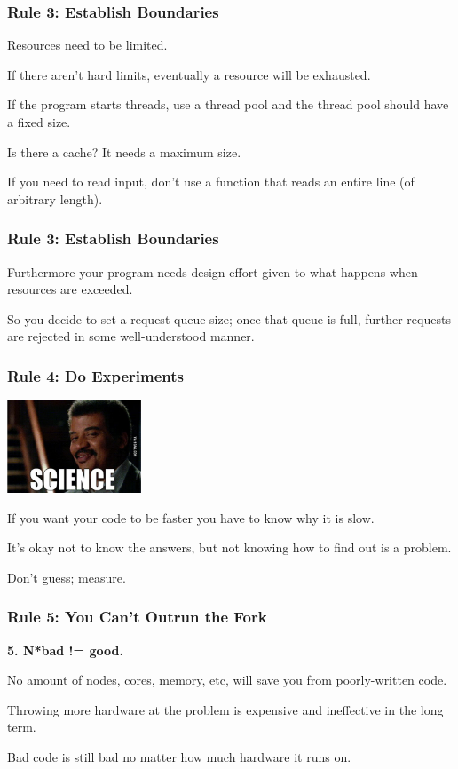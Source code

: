 \begin{frame}
\frametitle{Rule 3: Establish Boundaries}

Resources need to be limited. 

If there aren't hard limits, eventually a resource will be exhausted. 

If the program starts threads, use a thread pool and the thread pool should have a fixed size. 

Is there a cache? It needs a maximum size. 

If you need to read input, don't use a function that reads an entire line (of arbitrary length). 

\end{frame}



\begin{frame}
\frametitle{Rule 3: Establish Boundaries}

Furthermore your program needs design effort given to what happens when resources are exceeded. 

So you decide to set a request queue size; once that queue is full, further requests are rejected in some well-understood manner. 


\end{frame}



\begin{frame}
\frametitle{Rule 4: Do Experiments}

\begin{center}
	\includegraphics[width=0.3\textwidth]{images/ndg.jpg}
\end{center}

If you want your code to be faster you have to know why it is slow. 

It's okay not to know the answers, but not knowing how to find out is a problem. 

Don't guess; measure.

\end{frame}



\begin{frame}
\frametitle{Rule 5: You Can't Outrun the Fork}

\textbf{5. N*bad != good.}

No amount of nodes, cores, memory, etc, will save you from poorly-written code.

Throwing more hardware at the problem is expensive and ineffective in the long term. 

Bad code is still bad no matter how much hardware it runs on. 

\end{frame}


